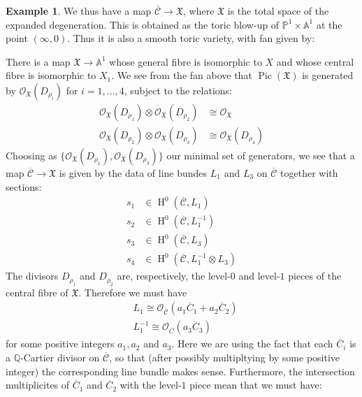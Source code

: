 \documentclass[11pt]{amsart}
\newcommand{\PP}{\mathbb P}
\newcommand{\OO}{\mathcal{O}}
\renewcommand{\to}{\rightarrow}
\newcommand{\Aaff}{\mathbb{A}}
\newcommand{\Pic}{\operatorname{Pic}}
\newcommand{\QQ}{\mathbb{Q}}
\newcommand{\HH}{\operatorname{H}}
\newcommand{\ovm}[1]{\overline{\mathcal{#1}}}
\newcommand{\ov}[1]{\overline{#1}}
\theoremstyle{definition}
\theoremstyle{definition}
\newtheorem{example}[thm]{Example}
\begin{document}
\begin{example}
We thus have a map $\ovm{C} \to \mathfrak{X}$, where $\mathfrak{X}$ is the total space of the expanded degeneration. This is obtained as the toric blow-up of $\PP^1 \times \Aaff^1$ at the point $(\infty,0)$. Thus it is also a smooth toric variety, with fan given by:
\begin{center}
\end{center}
There is a map $\mathfrak{X} \to \Aaff^1$ whose general fibre is isomorphic to $X$ and whose central fibre is isomorphic to $X_1$. We see from the fan above that $\Pic(\mathfrak{X})$ is generated by $\OO_{\mathfrak{X}}(D_{\rho_i})$ for $i=1,\ldots,4$, subject to the relations:
\begin{align*}
\OO_{\mathfrak{X}}(D_{\rho_1}) \otimes \OO_{\mathfrak{X}}(D_{\rho_2}) & \cong \OO_{\mathfrak{X}} \\
\OO_{\mathfrak{X}}(D_{\rho_2}) \otimes \OO_{\mathfrak{X}}(D_{\rho_3}) & \cong \OO_{\mathfrak{X}}(D_{\rho_4})
\end{align*}
Choosing as $\{\OO_{\mathfrak{X}}(D_{\rho_1}), \OO_{\mathfrak{X}}(D_{\rho_3})\}$ our minimal set of generators, we see that a map $\overline{\mathcal{C}} \to \mathfrak{X}$ is given by the data of line bundes $L_1$ and $L_3$ on $\overline{\mathcal{C}}$ together with sections:
\begin{align*}
s_1 & \in \HH^0(\overline{\mathcal{C}},L_1) \\
s_2 & \in \HH^0(\overline{\mathcal{C}},L_1^{-1}) \\
s_3 & \in \HH^0(\overline{\mathcal{C}},L_3) \\
s_4 & \in \HH^0(\overline{\mathcal{C}},L_1^{-1}\otimes L_3)
\end{align*}
The divisors $D_{\rho_1}$ and $D_{\rho_2}$ are, respectively, the level-$0$ and level-$1$ pieces of the central fibre of $\mathfrak{X}$. Therefore we must have
\begin{align*} & L_1 \cong \OO_{\overline{\mathcal{C}}}(a_1 \ov{C}_1 + a_2 \ov{C}_2) \\
& L_1^{-1} \cong \OO_{\ov{C}}(a_3 \ov{C}_3)
\end{align*}
for some positive integers $a_1,a_2$ and $a_3$. Here we are using the fact that each $\ov{C}_i$ is a $\QQ$-Cartier divisor on $\ovm{C}$, so that (after possibly multipltying by some positive integer) the corresponding line bundle makes sense. Furthermore, the intersection multiplicites of $\ov{C}_1$ and $\ov{C}_2$ with the level-$1$ piece mean that we must have:

\end{example}
\end{document}
